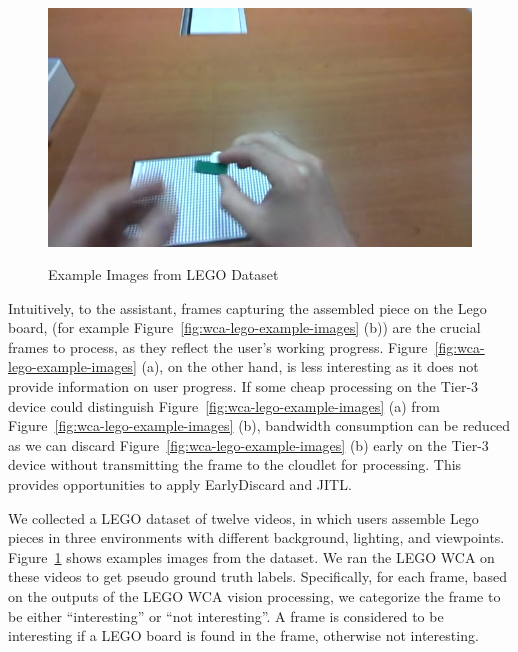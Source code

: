 \begin{figure}
\begin{minipage}[]{0.31\linewidth}
\end{minipage}
\begin{minipage}[]{0.31\linewidth}
\centering
\includegraphics[width=\linewidth]{FIGS/lego-dataset-3}\\
\end{minipage}
\caption{Example Images from LEGO Dataset}
\label{fig:wca-lego-dataset}
\end{figure}

Intuitively, to the assistant, frames capturing the assembled piece on the Lego
board, (for example Figure~\ref{fig:wca-lego-example-images} (b)) are the
crucial frames to process, as they reflect the user's working progress.
Figure~\ref{fig:wca-lego-example-images} (a), on the other hand, is less
interesting as it does not provide information on user progress. If some cheap
processing on the Tier-3 device could distinguish
Figure~\ref{fig:wca-lego-example-images} (a) from
Figure~\ref{fig:wca-lego-example-images} (b), bandwidth consumption can be
reduced as we can discard Figure~\ref{fig:wca-lego-example-images} (b) early on
the Tier-3 device without transmitting the frame to the cloudlet for processing.
This provides opportunities to apply EarlyDiscard and JITL.

We collected a LEGO dataset of twelve videos, in which users assemble Lego pieces
in three environments with different background, lighting, and viewpoints.
Figure~\ref{fig:wca-lego-dataset} shows examples images from the dataset. We ran
the LEGO WCA on these videos to get pseudo ground truth labels. Specifically,
for each frame, based on the outputs of the LEGO WCA vision processing, we
categorize the frame to be either ``interesting'' or ``not interesting''. A
frame is considered to be interesting if a LEGO board is found in the frame,
otherwise not interesting. 

